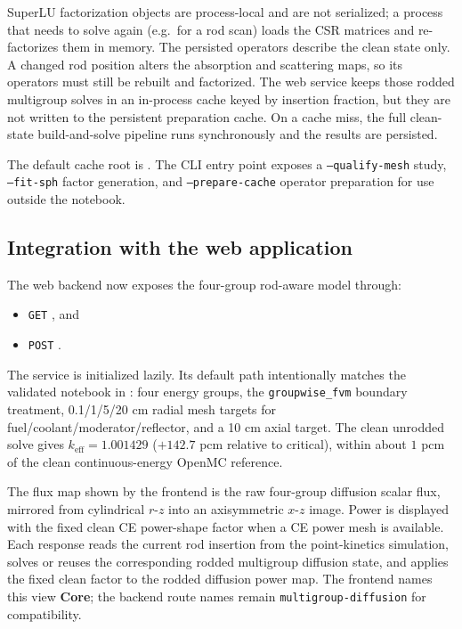 \documentclass[11pt]{article}
\begin{document}
SuperLU factorization objects are process-local and are not serialized; a
process that needs to solve again (e.g.\ for a rod scan) loads the CSR
matrices and re-factorizes them in memory.  The persisted operators describe
the clean state only.  A changed rod position alters the absorption and
scattering maps, so its operators must still be rebuilt and factorized.  The
web service keeps those rodded multigroup solves in an in-process cache keyed
by insertion fraction, but they are not written to the persistent preparation
cache.  On a cache miss, the full clean-state build-and-solve pipeline runs
synchronously and the results are persisted.

The default cache root is .  The
CLI entry point  exposes a
\texttt{--qualify-mesh} study, \texttt{--fit-sph} factor generation, and
\texttt{--prepare-cache} operator preparation for use outside the notebook.

\subsection{Integration with the web application}

The web backend now exposes the four-group rod-aware model through:
\begin{itemize}
  \item \texttt{GET} , and
  \item \texttt{POST} .
\end{itemize}
The service is initialized lazily.  Its default path intentionally matches the
validated notebook in : four energy groups,
the \texttt{groupwise\_fvm} boundary treatment, 0.1/1/5/20 cm radial mesh
targets for fuel/coolant/moderator/reflector, and a 10 cm axial target.  The
clean unrodded solve gives
$k_{\mathrm{eff}}=1.001429$ ($+142.7$ pcm relative to critical), within about
$1$ pcm of the clean continuous-energy OpenMC reference.

The flux map shown by the frontend is the raw four-group diffusion scalar flux,
mirrored from cylindrical $r$-$z$ into an axisymmetric $x$-$z$ image.  Power is
displayed with the fixed clean CE power-shape factor when a CE power mesh is
available.  Each response reads the current rod insertion from the
point-kinetics simulation, solves or reuses the corresponding rodded
multigroup diffusion state, and applies the fixed clean factor to the rodded
diffusion power map.  The frontend names this view \textbf{Core}; the backend
route names remain \texttt{multigroup-diffusion} for compatibility.
\end{document}
